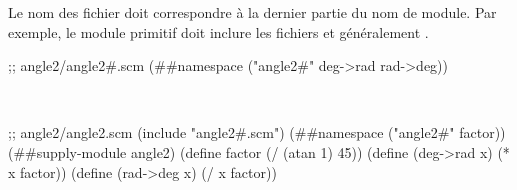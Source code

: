 Le nom des fichier doit correspondre à la dernier partie du nom de module.  Par
exemple, le module primitif  doit inclure les fichiers
 et généralement .\\
\begin{center}
\begin{mplisting}{0.9}
;; angle2/angle2#.scm
(##namespace ("angle2#" deg->rad rad->deg))
\end{mplisting}\\[4ex]
\begin{mplisting}{0.9}
;; angle2/angle2.scm
(include "angle2#.scm")
(##namespace ("angle2#" factor))
(##supply-module angle2)
(define factor (/ (atan 1) 45))
(define (deg->rad x) (* x factor))
(define (rad->deg x) (/ x factor))
\end{mplisting}
\end{center}


%

